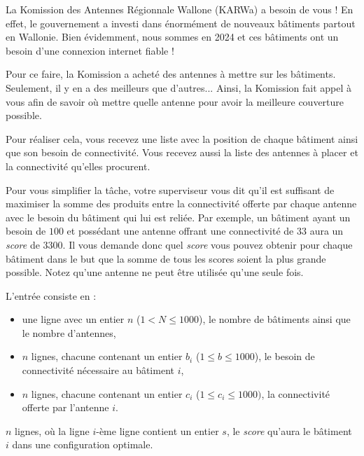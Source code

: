 \problemname{\problemyamlname}


La Komission des Antennes Régionnale Wallone (KARWa) a besoin de vous ! En effet, le gouvernement a investi dans énormément de nouveaux bâtiments partout en Wallonie. Bien évidemment, nous sommes en 2024 et ces bâtiments ont un besoin d'une connexion internet fiable !

Pour ce faire, la Komission a acheté des antennes à mettre sur les bâtiments. Seulement, il y en a des meilleurs que d'autres... Ainsi, la Komission fait appel à vous afin de savoir où mettre quelle antenne pour avoir la meilleure couverture possible.

Pour réaliser cela, vous recevez une liste avec la position de chaque bâtiment ainsi que son besoin de connectivité. Vous recevez aussi la liste des antennes à placer et la connectivité qu'elles procurent.

Pour vous simplifier la tâche, votre superviseur vous dit qu'il est suffisant de maximiser la somme des produits entre la connectivité offerte par chaque antenne avec le besoin du bâtiment qui lui est reliée. Par exemple, un bâtiment ayant un besoin de $100$ et possédant une antenne offrant une connectivité de $33$ aura un \emph{score} de $3300$. Il vous demande donc quel \emph{score} vous pouvez obtenir pour chaque bâtiment dans le but que la somme de tous les scores soient la plus grande possible. Notez qu'une antenne ne peut être utilisée qu'une seule fois.

\begin{Input}
    L'entrée consiste en :
    \begin{itemize}
      \item une ligne avec un entier $n$ ($1 < N \leq 1000$), le nombre de bâtiments ainsi que le nombre d'antennes,
      \item $n$ lignes, chacune contenant un entier $b_i$ ($1 \leq b \leq 1000$), le besoin de connectivité nécessaire au bâtiment $i$,
      \item $n$ lignes, chacune contenant un entier $c_i$ ($1 \leq c_i \leq 1000)$, la connectivité offerte par l'antenne $i$.
    \end{itemize}
\end{Input}

\begin{Output}
  $n$ lignes, où la ligne $i$-ème ligne contient un entier $s$, le \emph{score} qu'aura le bâtiment $i$ dans une configuration optimale.
\end{Output}
